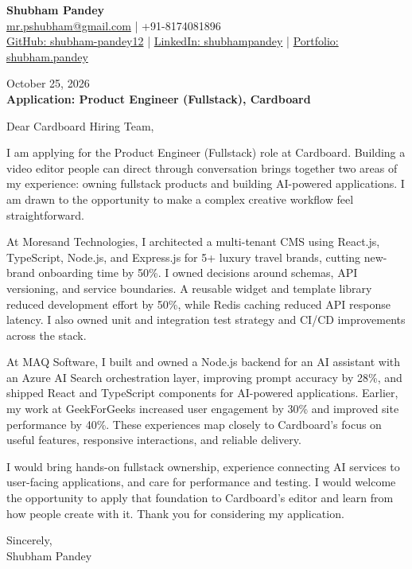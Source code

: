 \documentclass[a4paper,10pt]{article}
\begin{document}
\begin{center}
{\LARGE\textbf{Shubham Pandey}}\\[3pt]
\href{mailto:mr.pshubham@gmail.com}{mr.pshubham@gmail.com} | +91-8174081896\\[2pt]
\href{https://github.com/shubham-pandey12}{GitHub: shubham-pandey12} | \href{https://www.linkedin.com/in/shubham-pandey-a74716199/}{LinkedIn: shubhampandey} | \href{https://shubham-portfolio-mocha.vercel.app/}{Portfolio: shubham.pandey}
\end{center}
October 25, 2026\\[6pt]
\textbf{Application: Product Engineer (Fullstack), Cardboard}

\vspace{12pt}
Dear Cardboard Hiring Team,

\vspace{6pt}
I am applying for the Product Engineer (Fullstack) role at Cardboard. Building a video editor people can direct through conversation brings together two areas of my experience: owning fullstack products and building AI-powered applications. I am drawn to the opportunity to make a complex creative workflow feel straightforward.

\vspace{6pt}
At Moresand Technologies, I architected a multi-tenant CMS using React.js, TypeScript, Node.js, and Express.js for 5+ luxury travel brands, cutting new-brand onboarding time by 50\%. I owned decisions around schemas, API versioning, and service boundaries. A reusable widget and template library reduced development effort by 50\%, while Redis caching reduced API response latency. I also owned unit and integration test strategy and CI/CD improvements across the stack.

\vspace{6pt}
At MAQ Software, I built and owned a Node.js backend for an AI assistant with an Azure AI Search orchestration layer, improving prompt accuracy by 28\%, and shipped React and TypeScript components for AI-powered applications. Earlier, my work at GeekForGeeks increased user engagement by 30\% and improved site performance by 40\%. These experiences map closely to Cardboard's focus on useful features, responsive interactions, and reliable delivery.

\vspace{6pt}
I would bring hands-on fullstack ownership, experience connecting AI services to user-facing applications, and care for performance and testing. I would welcome the opportunity to apply that foundation to Cardboard's editor and learn from how people create with it. Thank you for considering my application.

\vspace{12pt}
Sincerely,\\[4pt]
Shubham Pandey
\end{document}
